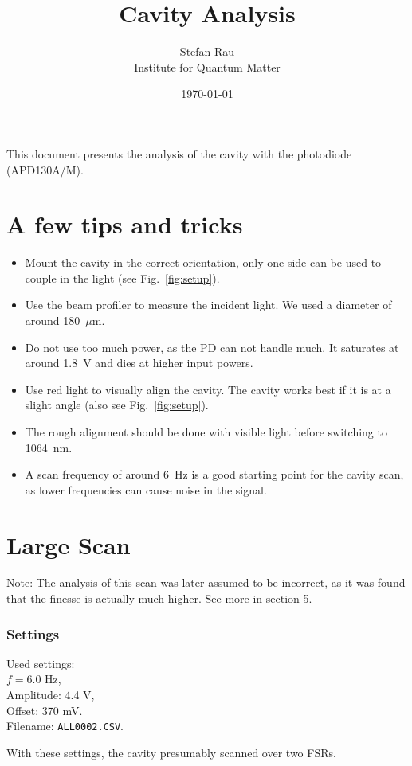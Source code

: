 \documentclass[a4paper,11pt]{article}
\title{Cavity Analysis}
\author{Stefan Rau \\ Institute for Quantum Matter}
\date{\today}
\begin{document}
\maketitle
\begin{center}
    \vspace{5cm}
    This document presents the analysis of the cavity with the photodiode (APD130A/M).
\end{center}
\newpage
\section{A few tips and tricks}
\begin{itemize}
    \item Mount the cavity in the correct orientation, only one side can be used to couple in the light (see Fig.~\ref{fig:setup}).
    \item Use the beam profiler to measure the incident light. We used a diameter of around 180~$\mu$m.
    \item Do not use too much power, as the PD can not handle much. It saturates at around 1.8~V and dies at higher input powers.
    \item Use red light to visually align the cavity. The cavity works best if it is at a slight angle (also see Fig.~\ref{fig:setup}).
    \item The rough alignment should be done with visible light before switching to 1064~nm.
    \item A scan frequency of around 6~Hz is a good starting point for the cavity scan, as lower frequencies can cause noise in the signal.
\end{itemize}
\newpage
\section{Large Scan}
Note: The analysis of this scan was later assumed to be incorrect, as it was found that the finesse is actually much higher. See more in section 5.
\subsubsection*{Settings}
Used settings:  \\
$f = 6.0$ Hz,  \\
Amplitude: 4.4 V,  \\
Offset: 370 mV.  \\
Filename: \texttt{ALL0002.CSV}.  


With these settings, the cavity presumably scanned over two FSRs.
\end{document}
